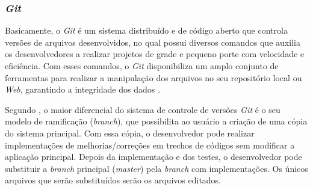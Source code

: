 \subsubsection{\textit{Git}}

Basicamente, o \textit{Git} é um sistema distribuído e de código aberto que controla versões de arquivos desenvolvidos, no qual possui diversos comandos que auxilia os desenvolvedores a realizar projetos de grade e pequeno porte com velocidade e eficiência.  Com esses comandos, o \textit{Git} disponibiliza um amplo conjunto de ferramentas para realizar a manipulação dos arquivos no seu repositório local ou \textit{Web}, garantindo a integridade dos dados \cite{GIT2010}.

Segundo , o maior diferencial do sistema de controle de versões \textit{Git} é o seu modelo de ramificação (\textit{branch}), que possibilita ao usuário a criação de uma cópia do sistema principal. Com essa cópia, o desenvolvedor pode realizar implementações de melhorias/correções em trechos de códigos sem modificar a aplicação principal. Depois da implementação e dos testes, o desenvolvedor pode substituir a \textit{branch} principal (\textit{master}) pela \textit{branch} com implementações. Os únicos arquivos que serão substituídos serão os arquivos editados.